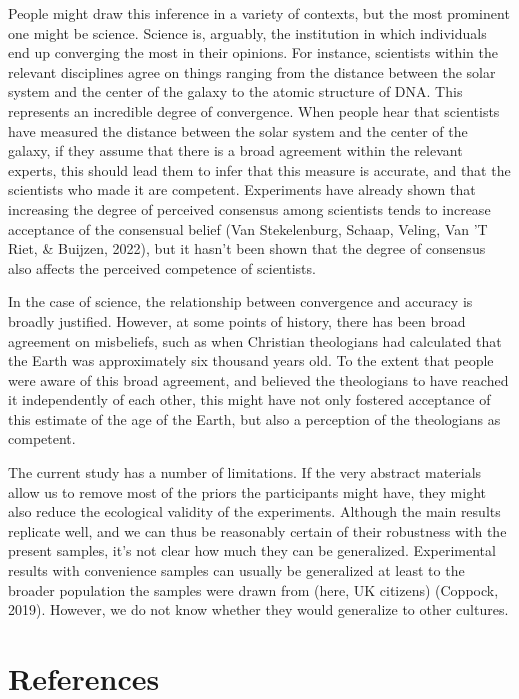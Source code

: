\documentclass[
  doc,floatsintext]{apa6}
\begin{document}
People might draw this inference in a variety of contexts, but the most prominent one might be science. Science is, arguably, the institution in which individuals end up converging the most in their opinions. For instance, scientists within the relevant disciplines agree on things ranging from the distance between the solar system and the center of the galaxy to the atomic structure of DNA. This represents an incredible degree of convergence. When people hear that scientists have measured the distance between the solar system and the center of the galaxy, if they assume that there is a broad agreement within the relevant experts, this should lead them to infer that this measure is accurate, and that the scientists who made it are competent. Experiments have already shown that increasing the degree of perceived consensus among scientists tends to increase acceptance of the consensual belief (Van Stekelenburg, Schaap, Veling, Van 'T Riet, \& Buijzen, 2022), but it hasn't been shown that the degree of consensus also affects the perceived competence of scientists.

In the case of science, the relationship between convergence and accuracy is broadly justified. However, at some points of history, there has been broad agreement on misbeliefs, such as when Christian theologians had calculated that the Earth was approximately six thousand years old. To the extent that people were aware of this broad agreement, and believed the theologians to have reached it independently of each other, this might have not only fostered acceptance of this estimate of the age of the Earth, but also a perception of the theologians as competent.

The current study has a number of limitations. If the very abstract materials allow us to remove most of the priors the participants might have, they might also reduce the ecological validity of the experiments. Although the main results replicate well, and we can thus be reasonably certain of their robustness with the present samples, it's not clear how much they can be generalized. Experimental results with convenience samples can usually be generalized at least to the broader population the samples were drawn from (here, UK citizens) (Coppock, 2019). However, we do not know whether they would generalize to other cultures.

\FloatBarrier

\hypertarget{references}{%
\section{References}\label{references}}
\end{document}
